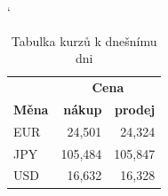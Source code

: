 \documentclass[11pt,a4paper]{article}
\begin{document}
  \begin{table}[ht]
    \catcode`
    \begin{center}
      \begin{tabular}{|l|r|r|}                               \hline
                      & \multicolumn{2}{c|}{\textbf{Cena}} \\\cline{2-3}
        \textbf{Měna} & \textbf{nákup} & \textbf{prodej}   \\\hline
        EUR           & 24,501         & 24,324            \\
        JPY           & 105,484        & 105,847           \\
        USD           & 16,632         & 16,328            \\\hline
      \end{tabular}
      \caption{Tabulka kurzů k dnešnímu dni}
      \label{tab1}
    \end{center}
  \end{table}
\end{document}
